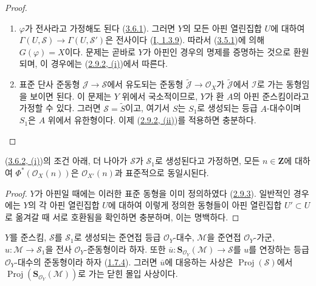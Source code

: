 \begin{proof}
\begin{enumerate}
  \item[\rm(i)] $\varphi$가 전사라고 가정해도 된다
    (\hyperref[II.3.6.1-ko]{3.6.1}). 그러면 $Y$의 모든 아핀 열린집합
    $U$에 대하여 $\Gamma(U,\mathcal{S})\to
    \Gamma(U,\mathcal{S}')$은 전사이다
    (\hyperref[I.1.3.9-ko]{I, 1.3.9}). 따라서
    (\hyperref[II.3.5.1-ko]{3.5.1})에 의해 $G(\varphi)=X$이다. 문제는
    곧바로 $Y$가 아핀인 경우의 명제를 증명하는 것으로 환원되며, 이
    경우에는 (\hyperref[II.2.9.2-ko]{2.9.2, (i)})에서 따른다.
  \item[\rm(ii)] 표준 단사 준동형 $\mathcal{J}\to\mathcal{S}$에서
    유도되는 준동형 $\widetilde{\mathcal{J}}\to\mathcal{O}_X$가
    $\widetilde{\mathcal{J}}$에서 $\mathcal{I}$로 가는 동형임을 보이면
    된다. 이 문제는 $Y$ 위에서 국소적이므로, $Y$가 환 $A$의 아핀
    준스킴이라고 가정할 수 있다. 그러면 $\mathcal{S}=\widetilde{S}$이고,
    여기서 $S$는 $S_1$로 생성되는 등급 $A$-대수이며 $S_1$은 $A$ 위에서
    유한형이다. 이제 (\hyperref[II.2.9.2-ko]{2.9.2, (ii)})를 적용하면
    충분하다.
\end{enumerate}
\end{proof}

\begin{corollary}[3.6.3]
\label{II.3.6.3-ko}
(\hyperref[II.3.6.2-ko]{3.6.2, (i)})의 조건 아래, 더 나아가
$\mathcal{S}$가 $\mathcal{S}_1$로 생성된다고 가정하면, 모든
$n\in\mathbf{Z}$에 대하여 $\Phi^*(\mathcal{O}_X(n))$은
$\mathcal{O}_{X'}(n)$과 표준적으로 동일시된다.
\end{corollary}

\begin{proof}
$Y$가 아핀일 때에는 이러한 표준 동형을 이미 정의하였다
(\hyperref[II.2.9.3-ko]{2.9.3}). 일반적인 경우에는 $Y$의 각 아핀
열린집합 $U$에 대하여 이렇게 정의한 동형들이 아핀 열린집합
$U'\subset U$로 옮겨갈 때 서로 호환됨을 확인하면 충분하며, 이는
명백하다.
\end{proof}

\begin{corollary}[3.6.4]
\label{II.3.6.4-ko}
$Y$를 준스킴, $\mathcal{S}$를 $\mathcal{S}_1$로 생성되는 준연접 등급
$\mathcal{O}_Y$-대수, $\mathcal{M}$을 준연접 $\mathcal{O}_Y$-가군,
$u:\mathcal{M}\to\mathcal{S}_1$을 전사 $\mathcal{O}_Y$-준동형이라
하자. 또한
$\overline{u}:\mathbf{S}_{\mathcal{O}_Y}(\mathcal{M})\to\mathcal{S}$를
$u$를 연장하는 등급 $\mathcal{O}_Y$-대수의 준동형이라 하자
(\hyperref[II.1.7.4-ko]{1.7.4}). 그러면 $\overline{u}$에 대응하는
사상은 $\operatorname{Proj}(\mathcal{S})$에서
$\operatorname{Proj}(\mathbf{S}_{\mathcal{O}_Y}(\mathcal{M}))$로 가는
닫힌 몰입 사상이다.
\end{corollary}

